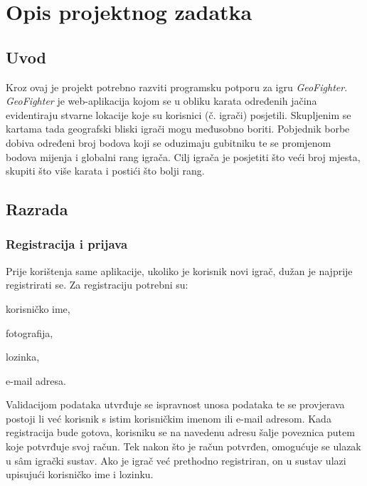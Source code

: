 \chapter{Opis projektnog zadatka}
		
		\section{Uvod}
		
		{Kroz ovaj je projekt potrebno razviti programsku potporu za igru  \emph{GeoFighter}. \\ \emph{GeoFighter} je web-aplikacija kojom se u obliku karata određenih jačina evidentiraju stvarne lokacije koje su korisnici (č. igrači) posjetili. Skupljenim se kartama tada geografski bliski igrači mogu međusobno boriti. Pobjednik borbe dobiva određeni broj bodova koji se oduzimaju gubitniku te se promjenom bodova mijenja i globalni rang igrača. Cilj igrača je posjetiti što veći broj mjesta, skupiti što više karata i postići što bolji rang. }
		
		\section{Razrada}
		
		\subsection{Registracija i prijava}
		
		{Prije korištenja same aplikacije, ukoliko je korisnik novi igrač, dužan je najprije registrirati se. Za registraciju potrebni su:}
	
		\begin{packed_item}
			\item {korisničko ime,}
			\item {fotografija,}
			\item {lozinka,}
			\item {e-mail adresa.}
		\end{packed_item}
		
		{Validacijom podataka utvrđuje se ispravnost unosa podataka te se provjerava postoji li već korisnik s istim korisničkim imenom ili e-mail adresom. Kada registracija bude gotova, korisniku se na navedenu adresu šalje poveznica putem koje potvrđuje svoj račun. Tek nakon što je račun potvrđen, omogućuje se ulazak u sâm igrački sustav.}
		{Ako je igrač već prethodno registriran, on u sustav ulazi upisujući korisničko ime i lozinku.}\\ \\ \\
		
